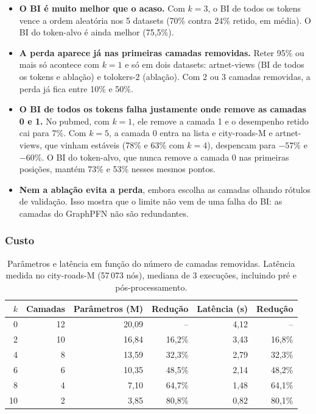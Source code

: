 \documentclass[12pt,a4paper]{article}
\begin{document}
\begin{itemize}
  \item \textbf{O BI é muito melhor que o acaso.} Com $k=3$, o BI de todos os tokens vence a ordem aleatória nos 5 datasets (70\% contra 24\% retido, em média). O BI do token-alvo é ainda melhor (75,5\%).
  \item \textbf{A perda aparece já nas primeiras camadas removidas.} Reter 95\% ou mais só acontece com $k=1$ e só em dois datasets: artnet-views (BI de todos os tokens e ablação) e tolokers-2 (ablação). Com 2 ou 3 camadas removidas, a perda já fica entre 10\% e 50\%.
  \item \textbf{O BI de todos os tokens falha justamente onde remove as camadas 0 e 1.} No pubmed, com $k=1$, ele remove a camada 1 e o desempenho retido cai para 7\%. Com $k=5$, a camada 0 entra na lista e city-roads-M e artnet-views, que vinham estáveis (78\% e 63\% com $k=4$), despencam para $-57\%$ e $-60\%$. O BI do token-alvo, que nunca remove a camada 0 nas primeiras posições, mantém 73\% e 53\% nesses mesmos pontos.
  \item \textbf{Nem a ablação evita a perda}, embora escolha as camadas olhando rótulos de validação. Isso mostra que o limite não vem de uma falha do BI: as camadas do GraphPFN não são redundantes.
\end{itemize}

\subsubsection{Custo}

\begin{table}[H]
\centering
\caption{Parâmetros e latência em função do número de camadas removidas. Latência medida no city-roads-M (57\,073 nós), mediana de 3 execuções, incluindo pré e pós-processamento.}
\label{tab:gpfn-custo}
\begin{tabular}{@{}rrrrrr@{}}
\toprule
$k$ & Camadas & Parâmetros (M) & Redução & Latência (s) & Redução \\
\midrule
0  & 12 & 20,09 & --     & 4,12 & --     \\
2  & 10 & 16,84 & 16,2\% & 3,43 & 16,8\% \\
4  & 8  & 13,59 & 32,3\% & 2,79 & 32,3\% \\
6  & 6  & 10,35 & 48,5\% & 2,14 & 48,2\% \\
8  & 4  & 7,10  & 64,7\% & 1,48 & 64,1\% \\
10 & 2  & 3,85  & 80,8\% & 0,82 & 80,1\% \\
\bottomrule
\end{tabular}
\end{table}
\end{document}
